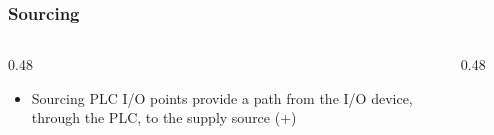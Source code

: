 \begin{frame}
    \frametitle{Sourcing}

    \begin{columns}
        \begin{column}{0.48\linewidth}
            \begin{itemize}
                \item Sourcing PLC I/O points provide a path from the I/O device, through the PLC, to the supply source (+)
            \end{itemize}
        \end{column}
        \begin{column}{0.48\linewidth}
            \begin{figure}
                \centering
                \resizebox{0.75\columnwidth}{!}{
                    
                }
            \end{figure}
            
            \vspace{0.5em}

            \begin{figure}
                \centering
                \resizebox{0.75\columnwidth}{!}{
                    
                }
            \end{figure}
        \end{column}
    \end{columns}    
\end{frame}

